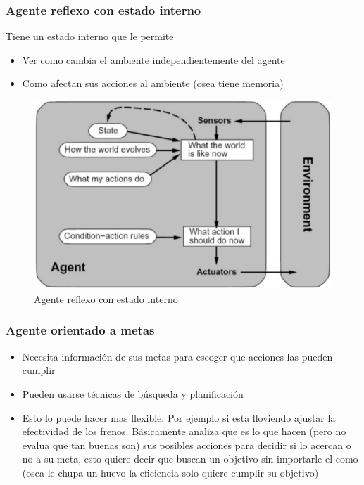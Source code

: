\subsubsection*{Agente reflexo con estado interno}
Tiene un estado interno que le permite
\begin{itemize}
  \item Ver como cambia el ambiente independientemente del agente
  \item Como afectan sus acciones al ambiente (osea tiene memoria)
\end{itemize}

\begin{figure}
  \centering
  \includegraphics[width=16cm, scale=1]{Images/Imagenes/AgenteReflexoEst.png}
  \caption{Agente reflexo con estado interno}
\end{figure}

\subsubsection*{Agente orientado a metas}
\begin{itemize}
  \item Necesita información de sus metas para escoger que acciones las pueden cumplir
  \item Pueden usarse técnicas de búsqueda y planificación
  \item Esto lo puede hacer mas flexible. Por ejemplo si esta lloviendo ajustar la efectividad de los frenos. Básicamente analiza que es lo que hacen (pero no evalua que tan buenas son) sus posibles acciones para decidir si lo acercan o no a su meta, esto quiere decir que buscan un objetivo sin importarle el como (osea le chupa un huevo la eficiencia solo quiere cumplir su objetivo)
\end{itemize}

